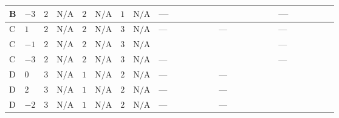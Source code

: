 \documentclass[8pt]{article}
\begin{document}
\begin{landscape}
\begin{longtable}{@{}llcccccc >{\raggedright\arraybackslash}p{0.21\linewidth} >{\raggedright\arraybackslash}p{0.21\linewidth} >{\raggedright\arraybackslash}p{0.21\linewidth}@{}}
\midrule
B & $-3$ & $2$ & $\text{N/A}$ & $2$ & $\text{N/A}$ & $1$ & $\text{N/A}$ & --- & \scriptsize\adjustbox{max width=\linewidth}{$\begin{gathered} +{g_1}^2 \left(-18 {g_2}^2-15 {\lambda_{HS_1}^{(A)}}\right)\end{gathered}$} & --- \\
\midrule
C & $1$ & $2$ & $\text{N/A}$ & $2$ & $\text{N/A}$ & $3$ & $\text{N/A}$ & --- & --- & --- \\
\midrule
C & $-1$ & $2$ & $\text{N/A}$ & $2$ & $\text{N/A}$ & $3$ & $\text{N/A}$ & \scriptsize\adjustbox{max width=\linewidth}{$\begin{gathered} +4 {\lambda_{X_{17}}^{(1)}} (\left({\lambda_{11}}\right)^{*}-2 \left({\lambda_{X_{17}}^{(1)}}\right)^{*})\end{gathered}$} & \scriptsize\adjustbox{max width=\linewidth}{$\begin{gathered} +{g_1}^2 \left(-6 {g_2}^2-3 {\lambda_{HS_1}^{(A)}}\right)\end{gathered}$} & --- \\
\midrule
C & $-3$ & $2$ & $\text{N/A}$ & $2$ & $\text{N/A}$ & $3$ & $\text{N/A}$ & --- & \scriptsize\adjustbox{max width=\linewidth}{$\begin{gathered} +{g_1}^2 \left(-18 {g_2}^2-15 {\lambda_{HS_1}^{(A)}}\right)\end{gathered}$} & --- \\
\midrule
D & $0$ & $3$ & $\text{N/A}$ & $1$ & $\text{N/A}$ & $2$ & $\text{N/A}$ & --- & --- & \scriptsize\adjustbox{max width=\linewidth}{$\begin{gathered} {\lambda_{HS_1}^{(A)}} (6 \operatorname{Tr}\!\left({Y_d}\,\left({Y_d}\right)^{\dagger}\right)+2 \operatorname{Tr}\!\left({Y_e}\,\left({Y_e}\right)^{\dagger}\right)+6 \operatorname{Tr}\!\left({Y_u}\,\left({Y_u}\right)^{\dagger}\right)+16 {\lambda_{S_1}^{(A)}})\end{gathered}$} \\
\midrule
D & $2$ & $3$ & $\text{N/A}$ & $1$ & $\text{N/A}$ & $2$ & $\text{N/A}$ & --- & --- & \scriptsize\adjustbox{max width=\linewidth}{$\begin{gathered} {\lambda_{HS_1}^{(A)}} (6 \operatorname{Tr}\!\left({Y_d}\,\left({Y_d}\right)^{\dagger}\right)+2 \operatorname{Tr}\!\left({Y_e}\,\left({Y_e}\right)^{\dagger}\right)+6 \operatorname{Tr}\!\left({Y_u}\,\left({Y_u}\right)^{\dagger}\right)+16 {\lambda_{S_1}^{(A)}})\end{gathered}$} \\
\midrule
D & $-2$ & $3$ & $\text{N/A}$ & $1$ & $\text{N/A}$ & $2$ & $\text{N/A}$ & --- & --- & \scriptsize\adjustbox{max width=\linewidth}{$\begin{gathered} {\lambda_{HS_1}^{(A)}} (6 \operatorname{Tr}\!\left({Y_d}\,\left({Y_d}\right)^{\dagger}\right)+2 \operatorname{Tr}\!\left({Y_e}\,\left({Y_e}\right)^{\dagger}\right)+6 \operatorname{Tr}\!\left({Y_u}\,\left({Y_u}\right)^{\dagger}\right)+16 {\lambda_{S_1}^{(A)}})\end{gathered}$} \\

\end{longtable}
\end{landscape}
\end{document}
